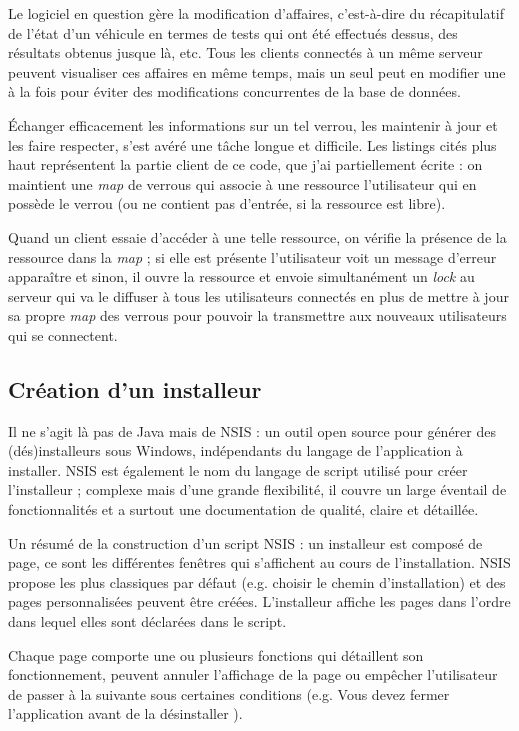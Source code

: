 Le logiciel en question gère la modification d'affaires, c'est-à-dire du récapitulatif de l'état d'un véhicule en termes de tests qui ont été effectués dessus, des résultats obtenus jusque là, etc. Tous les clients connectés à un même serveur peuvent visualiser ces affaires en même temps, mais un seul peut en modifier une à la fois pour éviter des modifications concurrentes de la base de données.

Échanger efficacement les informations sur un tel verrou, les maintenir à jour et les faire respecter, s'est avéré une tâche longue et difficile. Les listings cités plus haut représentent la partie client de ce code, que j'ai partiellement écrite : on maintient une \textit{map} de verrous qui associe à une ressource l'utilisateur qui en possède le verrou (ou ne contient pas d'entrée, si la ressource est libre). 

Quand un client essaie d'accéder à une telle ressource, on vérifie la présence de la ressource dans la \textit{map} ; si elle est présente l'utilisateur voit un message d'erreur apparaître et sinon, il ouvre la ressource et envoie simultanément un \textit{lock} au serveur qui va le diffuser à tous les utilisateurs connectés en plus de mettre à jour sa propre \textit{map} des verrous pour pouvoir la transmettre aux nouveaux utilisateurs qui se connectent. 

\subsection{Création d'un installeur}
Il ne s'agit là pas de Java mais de NSIS\cite{nsis} : un outil open source pour générer des (dés)installeurs sous Windows, indépendants du langage de l'application à installer. NSIS est également le nom du langage de script utilisé pour créer l'installeur ; complexe mais d'une grande flexibilité, il couvre un large éventail de fonctionnalités et a surtout une documentation de qualité, claire et détaillée\cite{nsis_doc}. 

Un résumé de la construction d'un script NSIS : un installeur est composé de page, ce sont les différentes fenêtres qui s'affichent au cours de l'installation. NSIS propose les plus classiques par défaut (e.g. choisir le chemin d'installation) et des pages personnalisées peuvent être créées. L'installeur affiche les pages dans l'ordre dans lequel elles sont déclarées dans le script. 

Chaque page comporte une ou plusieurs fonctions qui détaillent son fonctionnement, peuvent annuler l'affichage de la page ou empêcher l'utilisateur de passer à la suivante sous certaines conditions (e.g. \og Vous devez fermer l'application avant de la désinstaller \fg).


